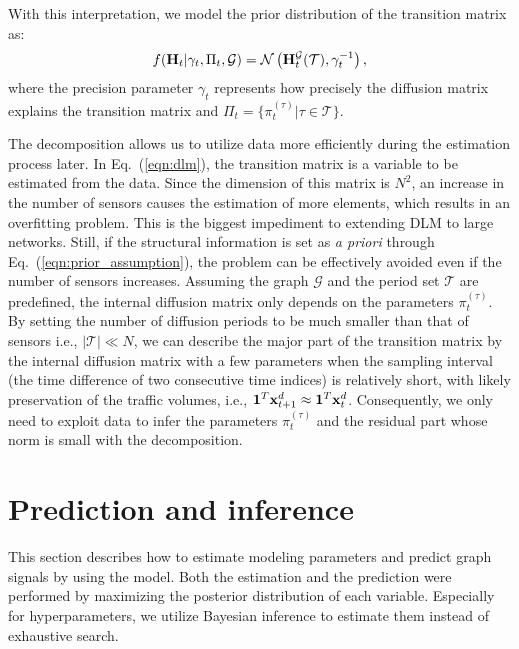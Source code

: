 \documentclass[journal]{IEEEtran}
\begin{document}
With this interpretation, we model the prior distribution of the transition matrix as:
\begin{equation}\label{eqn:prior_assumption}
    f({\bf{H}}_t|\gamma_t,\Pi_t,\mathcal{G})=\mathcal{N}\left({\bf{H}}_t^{\mathcal{G}}(\mathcal{T}),\gamma_t^{-1}\right),
\end{equation}
where the precision parameter $\gamma_t$ represents how precisely the diffusion matrix explains the transition matrix and $\Pi_t=\{\pi_t^{(\tau)}|\tau\in\mathcal{T}\}$.


The decomposition allows us to utilize data more efficiently during the estimation process later.
In Eq.~(\ref{eqn:dlm}), the transition matrix is a variable to be estimated from the data. Since the dimension of this matrix is $N^2$, an increase in the number of sensors causes the estimation of more elements, which results in an overfitting problem. This is the biggest impediment to extending DLM to large networks. Still, if the structural information is set as {\it{a priori}} through Eq.~(\ref{eqn:prior_assumption}), the problem can be effectively avoided even if the number of sensors increases.
Assuming the graph $\mathcal{G}$ and the period set $\mathcal{T}$ are predefined, the internal diffusion matrix only depends on the parameters $\pi_t^{(\tau)}$. By setting the number of diffusion periods to be much smaller than that of sensors i.e., $|\mathcal{T}|\ll N$, we can describe the major part of the transition matrix by the internal diffusion matrix with a few parameters when the sampling interval (the time difference of two consecutive time indices) is relatively short, with likely preservation of the traffic volumes, i.e., ${\bf{1}}^T{\bf{x}}_{t+1}^d\approx {\bf{1}}^T{\bf{x}}_{t}^d$.
Consequently, we only need to exploit data to infer the parameters $\pi_t^{(\tau)}$ and the residual part whose norm is small with the decomposition.



\section{Prediction and inference}
This section describes how to estimate modeling parameters and predict graph signals by using the model. Both the estimation and the prediction were performed by maximizing the posterior distribution of each variable.
Especially for hyperparameters, we utilize Bayesian inference to estimate them instead of exhaustive search.
\end{document}
